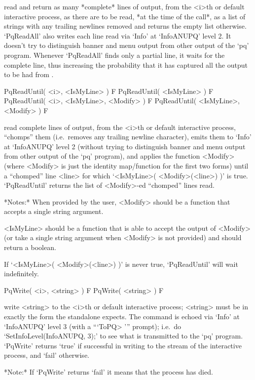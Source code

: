 read and return as many *complete* lines of  {\ANUPQ}  output,  from  the
<i>th or default interactive {\ANUPQ} process, as there are to  be  read,
*at the time of the call*,  as  a  list  of  strings  with  any  trailing
newlines removed and returns the empty list otherwise.  `PqReadAll'  also
writes each line read via `Info' at `InfoANUPQ' level 2. It  doesn't  try
to distinguish banner and menu output  from  other  output  of  the  `pq'
program. Whenever `PqReadAll' finds only a partial line, it waits for  the
complete line, thus increasing the probability that it has  captured  all
the output to be had from {\ANUPQ}.

\>PqReadUntil( <i>, <IsMyLine> ) F
\>PqReadUntil( <IsMyLine> ) F
\>PqReadUntil( <i>, <IsMyLine>, <Modify> ) F
\>PqReadUntil( <IsMyLine>, <Modify> ) F

read complete lines  of  {\ANUPQ}  output,  from  the  <i>th  or  default
interactive {\ANUPQ} process, ``chomps'' them (i.e.~removes any  trailing
newline character), emits them to `Info' at `InfoANUPQ' level 2  (without
trying to distinguish banner and menu output from  other  output  of  the
`pq' program), and applies the function <Modify> (where <Modify>  is  just
the identity map/function for the first two forms)  until  a  ``chomped''
line  <line>  for  which  `<IsMyLine>(  <Modify>(<line>)  )'   is   true.
`PqReadUntil' returns the list of <Modify>-ed ``chomped'' lines read.

*Notes:* 
When provided by the user, <Modify> should be a function that  accepts  a
single string argument.

<IsMyLine> should be a function that is able  to  accept  the  output  of
<Modify> (or take a single string argument when <Modify> is not provided)
and should return a boolean.

If `<IsMyLine>( <Modify>(<line>) )' is  never  true,  `PqReadUntil'  will
wait indefinitely.

\>PqWrite( <i>, <string> ) F
\>PqWrite( <string> ) F

write <string> to the <i>th  or  default  interactive  {\ANUPQ}  process;
<string> must be in exactly the form the {\ANUPQ} standalone expects. The
command is echoed via `Info' at `InfoANUPQ' level 3 (with a  ```ToPQ> '''
prompt); i.e.~do `SetInfoLevel(InfoANUPQ, 3);' to see what is transmitted
to the `pq' program. `PqWrite' returns `true' if successful in writing  to
the stream of the interactive {\ANUPQ} process, and `fail' otherwise.

*Note:*
If `PqWrite' returns `fail' it means that the {\ANUPQ} process has died.

